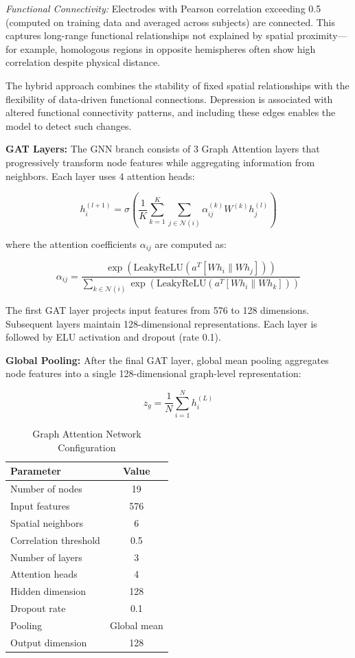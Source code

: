 \documentclass[blue,fullpaper]{ludusofficial}  %
\begin{document}
\textit{Functional Connectivity:} Electrodes with Pearson correlation exceeding 0.5 (computed on training data and averaged across subjects) are connected. This captures long-range functional relationships not explained by spatial proximity—for example, homologous regions in opposite hemispheres often show high correlation despite physical distance.

The hybrid approach combines the stability of fixed spatial relationships with the flexibility of data-driven functional connections. Depression is associated with altered functional connectivity patterns, and including these edges enables the model to detect such changes.

\textbf{GAT Layers:} The GNN branch consists of 3 Graph Attention layers that progressively transform node features while aggregating information from neighbors. Each layer uses 4 attention heads:

\begin{equation}
h_i^{(l+1)} = \sigma\left(\frac{1}{K}\sum_{k=1}^{K}\sum_{j \in \mathcal{N}(i)} \alpha_{ij}^{(k)} W^{(k)} h_j^{(l)}\right)
\end{equation}

where the attention coefficients $\alpha_{ij}$ are computed as:

\begin{equation}
\alpha_{ij} = \frac{\exp(\text{LeakyReLU}(a^T[Wh_i \| Wh_j]))}{\sum_{k \in \mathcal{N}(i)} \exp(\text{LeakyReLU}(a^T[Wh_i \| Wh_k]))}
\end{equation}

The first GAT layer projects input features from 576 to 128 dimensions. Subsequent layers maintain 128-dimensional representations. Each layer is followed by ELU activation and dropout (rate 0.1).

\textbf{Global Pooling:} After the final GAT layer, global mean pooling aggregates node features into a single 128-dimensional graph-level representation:

\begin{equation}
z_g = \frac{1}{N}\sum_{i=1}^{N} h_i^{(L)}
\end{equation}

\begin{table}[h!]
\centering
\caption{Graph Attention Network Configuration}
\label{tab:gat}
\begin{tabular}{|l|c|}
\hline
\textbf{Parameter} & \textbf{Value} \\
\hline
Number of nodes & 19 \\
\hline
Input features & 576 \\
\hline
Spatial neighbors & 6 \\
\hline
Correlation threshold & 0.5 \\
\hline
Number of layers & 3 \\
\hline
Attention heads & 4 \\
\hline
Hidden dimension & 128 \\
\hline
Dropout rate & 0.1 \\
\hline
Pooling & Global mean \\
\hline
Output dimension & 128 \\
\hline
\end{tabular}
\end{table}
\end{document}
